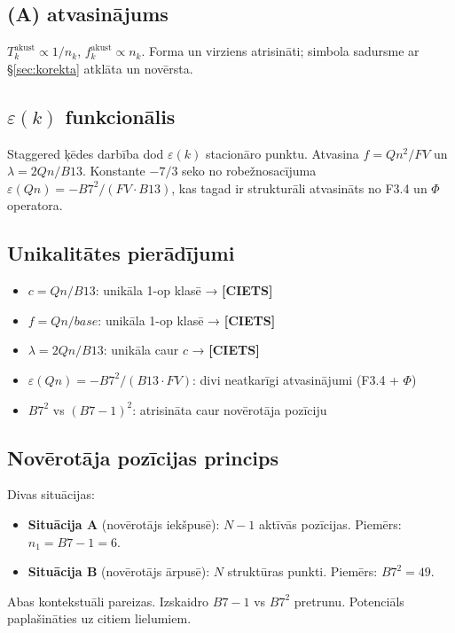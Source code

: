 \documentclass[12pt,a4paper]{article}
\begin{document}
\subsection*{(A) atvasinājums}

$T_k^{\text{akust}} \propto 1/n_k$, $f_k^{\text{akust}} \propto n_k$. Forma un virziens atrisināti; simbola sadursme ar \S\ref{sec:korekta} atklāta un novērsta.

\subsection*{$\varepsilon(k)$ funkcionālis}

Staggered ķēdes darbība dod $\varepsilon(k)$ stacionāro punktu. Atvasina $f = Qn^2/FV$ un $\lambda = 2Qn/B13$. Konstante $-7/3$ seko no robežnosacījuma $\varepsilon(Qn) = -B7^2/(FV\cdot B13)$, kas tagad ir strukturāli atvasināts no F3.4 un $\Phi$ operatora.

\subsection*{Unikalitātes pierādījumi}

\begin{itemize}
    \item $c = Qn/B13$: unikāla 1-op klasē → \textbf{[CIETS]}
    \item $f = Qn/base$: unikāla 1-op klasē → \textbf{[CIETS]}
    \item $\lambda = 2Qn/B13$: unikāla caur $c$ → \textbf{[CIETS]}
    \item $\varepsilon(Qn) = -B7^2/(B13 \cdot FV)$: divi neatkarīgi atvasinājumi (F3.4 + $\Phi$)
    \item $B7^2$ vs $(B7-1)^2$: atrisināta caur novērotāja pozīciju
\end{itemize}

\subsection*{Novērotāja pozīcijas princips}

Divas situācijas:
\begin{itemize}
    \item \textbf{Situācija A} (novērotājs iekšpusē): $N-1$ aktīvās pozīcijas. Piemērs: $n_1 = B7-1 = 6$.
    \item \textbf{Situācija B} (novērotājs ārpusē): $N$ struktūras punkti. Piemērs: $B7^2 = 49$.
\end{itemize}
Abas kontekstuāli pareizas. Izskaidro $B7-1$ vs $B7^2$ pretrunu. Potenciāls paplašināties uz citiem lielumiem.
\end{document}
